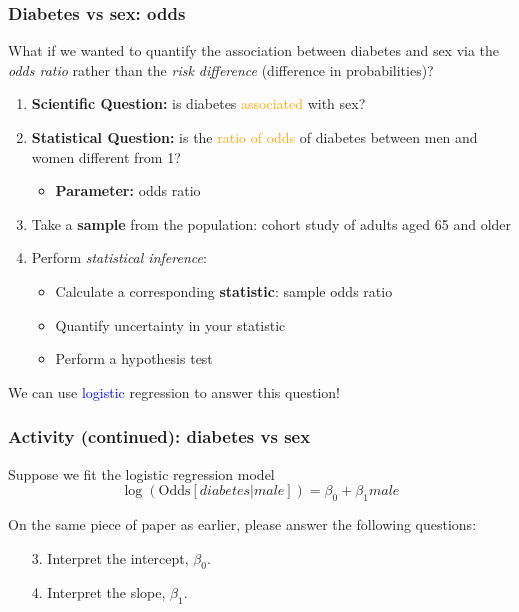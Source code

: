 \documentclass[12pt, 
hyperref={colorlinks=true, linkcolor=blue, urlcolor=cyan}]{beamer}
\begin{document}
\begin{frame}
\frametitle{Diabetes vs sex: odds}
\begin{small} What if we wanted to quantify the association between diabetes and sex via the \textit{odds ratio} rather than the \textit{risk difference} (difference in probabilities)? \end{small} \pause

\vspace{-0.3cm}

\begin{enumerate}
\item \textbf{Scientific Question:} is diabetes \textcolor{orange}{associated} with sex? \pause
\item \textbf{Statistical Question:} is the \textcolor{orange}{ratio of odds} of diabetes between men and women different from 1? \pause
	\begin{itemize}
	\item \textbf{Parameter:} odds ratio \pause
	\end{itemize}
\item Take a \textbf{sample} from the population: cohort study of adults aged 65 and older \pause
\item Perform \textit{statistical inference}:
	\begin{itemize}
	\item Calculate a corresponding \textbf{statistic}: sample odds ratio
	\item Quantify uncertainty in your statistic
	\item Perform a hypothesis test \pause
	\end{itemize}
\end{enumerate}

\vspace{-0.4cm}
We can use \textcolor{blue}{logistic} regression to answer this question!
\end{frame}

\begin{frame}
\frametitle{Activity (continued): diabetes vs sex}
Suppose we fit the logistic regression model $$\log\left(\text{Odds}[diabetes | male]\right) = \beta_0 + \beta_1 male$$

On the same piece of paper as earlier, please answer the following questions:

\begin{enumerate}
\item[3.] Interpret the intercept, $\beta_0$.
\item[4.] Interpret the slope, $\beta_1$.
\end{enumerate}
\end{frame}
\end{document}
